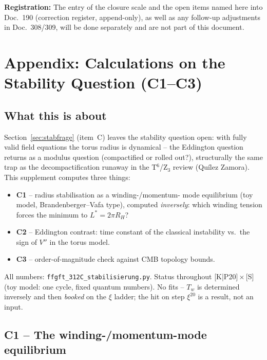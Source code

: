 \medskip
\noindent\textbf{Registration:} The entry of the closure scale and
the open items named here into Doc.~190 (correction register,
append-only), as well as any follow-up adjustments in Doc.~308/309,
will be done separately and are not part of this document.


\appendix
\chapter{Appendix: Calculations on the Stability Question (C1--C3)}
\label{app:stab}

\section*{What this is about}

Section~\ref{sec:stabfrage} (item~C) leaves the stability question open: with
fully valid field equations the torus radius is dynamical -- the
Eddington question returns as a modulus question (compactified or
rolled out?), structurally the same trap as the decompactification
runaway in the T$^6$/Z$_3$ review (Quílez Zamora). This supplement
computes three things:

\begin{itemize}
  \item \textbf{C1} -- radius stabilisation as a winding-/momentum-%
        mode equilibrium (toy model, Brandenberger--Vafa type),
        computed \emph{inversely}: which winding tension forces the
        minimum to $L^{*} = 2\pi R_H$?
  \item \textbf{C2} -- Eddington contrast: time constant of the
        classical instability vs.\ the sign of $V''$ in the torus
        model.
  \item \textbf{C3} -- order-of-magnitude check against CMB topology
        bounds.
\end{itemize}

All numbers: \texttt{ffgft\_312C\_stabilisierung.py}. Status
throughout [K|P20]\,$\times$\,[S] (toy model: one cycle, fixed
quantum numbers). No fits -- $T_w$ is determined inversely and then
\emph{booked} on the $\xi$ ladder; the hit on step $\xi^{20}$ is a
result, not an input.

\section{C1 -- The winding-/momentum-mode equilibrium}

